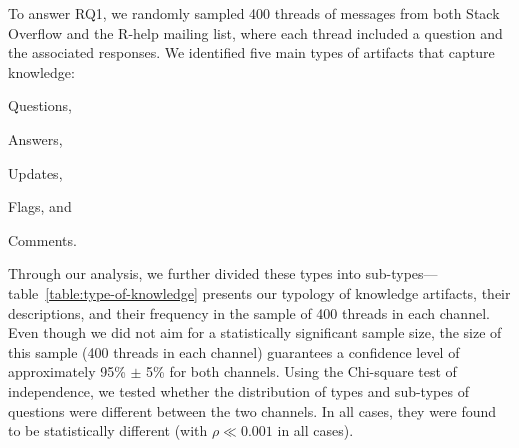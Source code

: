 \documentclass[smallextended]{svjour3}       %
\newcommand{\SO}{Stack Overflow\xspace}
\newcommand{\RH}{R-help\xspace}
\begin{document}
To answer RQ1, we randomly sampled 400 threads of messages from both \SO and the \RH mailing list, where each thread included a question and the associated responses. We identified five main types of artifacts that capture knowledge:
\begin{enumerate*}[label=(\arabic*)]
\item Questions, 
\item Answers,
\item Updates,
\item Flags, and
\item Comments.
\end{enumerate*}
Through our analysis, we further divided these types into sub-types---table~\ref{table:type-of-knowledge} presents our typology of knowledge artifacts, their
descriptions, and their frequency in the sample of 400 threads in each channel. Even though we did not aim for a statistically significant sample size, the size of this sample
(400 threads in each channel) guarantees a confidence level of approximately 95\% $\pm$ 5\% for both channels. Using the Chi-square test of independence, we tested whether the distribution of types and sub-types of questions were different between the two channels.  In
all cases, they were found to be statistically different (with $\rho \ll 0.001$ in all cases).
\end{document}
